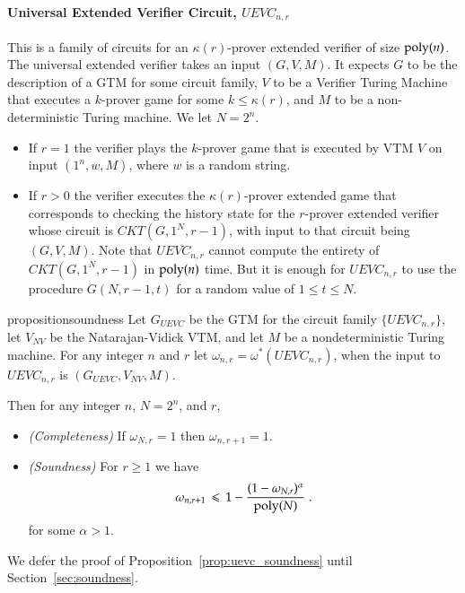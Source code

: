 \paragraph{Universal Extended Verifier Circuit, $UEVC_{n,r}$} This is a family of circuits for an $\kappa(r)$-prover extended verifier of size $\operatorname{poly}(n)$. The universal extended verifier takes an input $(G,V,M)$. It expects $G$ to be the description of a GTM for some circuit family, $V$ to be a Verifier Turing Machine that executes a $k$-prover game for some $k \leq \kappa(r)$, and $M$ to be a non-deterministic Turing machine. %
We let $N = 2^n$.
\begin{itemize}
\item If $r=1$ the verifier plays the $k$-prover game that is executed by VTM $V$ on input $(1^n,w,M)$, where $w$ is a random string.

\item If $r>0$ the verifier executes the $\kappa(r)$-prover extended game that corresponds to checking the history state for the $r$-prover extended verifier whose circuit is $CKT(G,1^N,r-1)$, with input to that circuit being $(G,V,M)$. Note that $UEVC_{n,r}$ cannot compute the entirety of $CKT(G,1^N,r-1)$ in $\operatorname{poly}(n)$ time. But it is enough for $UEVC_{n,r}$ to use the procedure $G(N,r-1,t)$ for a random value of $1\leq t\leq N$.
\end{itemize}

\begin{restatable}{proposition}{soundness}
	Let $G_{UEVC}$ be the GTM for the circuit family $\{UEVC_{n,r}\}$, let $V_{NV}$ be the Natarajan-Vidick VTM, and let $M$ be a nondeterministic Turing machine. For any integer $n$ and $r$ let $\omega_{n,r} = \omega^*(UEVC_{n,r})$, when the input to $UEVC_{n,r}$ is $(G_{UEVC},V_{NV},M)$. 
	
	Then for any integer $n$, $N=2^n$, and $r$,
	\begin{itemize}
	\item \emph{(Completeness)} If $\omega_{N,r}=1$ then $\omega_{n,r+1}=1$.
	\item \emph{(Soundness)} For $r \geq 1$ we have
	\[
		\omega_{n,r+1} \,\leqslant\, 1 - \frac{(1 - \omega_{N,r})^\alpha}{\operatorname{poly}(N)}\;.
	\]
	for some $\alpha > 1$.
	\end{itemize}
	\label{prop:uevc_soundness}
\end{restatable}

We defer the proof of Proposition~\ref{prop:uevc_soundness} until Section~\ref{sec:soundness}. 


